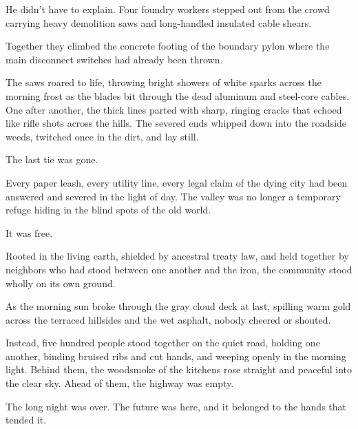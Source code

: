 He didn't have to explain. Four foundry workers stepped out from the crowd carrying heavy demolition saws and long-handled insulated cable shears. 

Together they climbed the concrete footing of the boundary pylon where the main disconnect switches had already been thrown. 

The saws roared to life, throwing bright showers of white sparks across the morning frost as the blades bit through the dead aluminum and steel-core cables. One after another, the thick lines parted with sharp, ringing cracks that echoed like rifle shots across the hills. The severed ends whipped down into the roadside weeds, twitched once in the dirt, and lay still.

The last tie was gone. 

Every paper leash, every utility line, every legal claim of the dying city had been answered and severed in the light of day. The valley was no longer a temporary refuge hiding in the blind spots of the old world. 

It was free. 

Rooted in the living earth, shielded by ancestral treaty law, and held together by neighbors who had stood between one another and the iron, the community stood wholly on its own ground.

As the morning sun broke through the gray cloud deck at last, spilling warm gold across the terraced hillsides and the wet asphalt, nobody cheered or shouted. 

Instead, five hundred people stood together on the quiet road, holding one another, binding bruised ribs and cut hands, and weeping openly in the morning light. Behind them, the woodsmoke of the kitchens rose straight and peaceful into the clear sky. Ahead of them, the highway was empty. 

The long night was over. The future was here, and it belonged to the hands that tended it.
